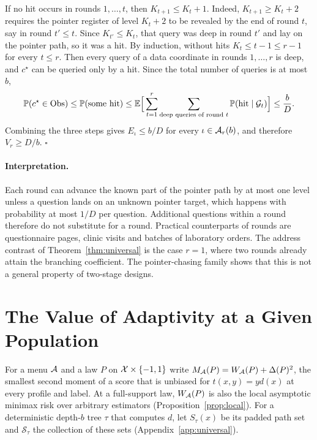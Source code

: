 If no hit occurs in rounds $1,\ldots,t$, then $K_{t+1}\le K_t+1$. Indeed,
$K_{t+1}\ge K_t+2$ requires the pointer register of level $K_t+2$ to be
revealed by the end of round $t$, say in round $t'\le t$. Since
$K_{t'}\le K_t$, that query was deep in round $t'$ and lay on the pointer path,
so it was a hit. By induction, without hits $K_t\le t-1\le r-1$ for every
$t\le r$. Then every query of a data coordinate in rounds $1,\ldots,r$ is deep,
and $c^\star$ can be queried only by a hit. Since the total number of queries
is at most $b$,
\[
 \mathbb P(c^\star\in{\rm Obs})\le\mathbb P(\text{some hit})
 \le\mathbb{E}\Big[\sum_{t=1}^r\sum_{\text{deep queries of round }t}\mathbb P(\text{hit}\mid\mathcal G_t)\Big]
 \le\frac bD .
\]
Combining the three steps gives $E_\iota\le b/D$ for every $\iota\in\mathcal A_r(b)$,
and therefore $V_r\ge D/b$. \hfill$\square$



\paragraph{Interpretation.}
Each round can advance the known part of the pointer path by at most one
level unless a question lands on an unknown pointer target, which happens
with probability at most $1/D$ per question. Additional questions within a
round therefore do not substitute for a round. Practical counterparts of
rounds are questionnaire pages, clinic visits and batches of laboratory
orders. The address contrast of Theorem~\ref{thm:universal} is the case
$r=1$, where two rounds already attain the branching coefficient. The
pointer-chasing family shows that this is not a general property of
two-stage designs.

\section{The Value of Adaptivity at a Given Population}\label{app:population}
For a menu $\mathcal A$ and a law $P$ on $\mathcal X\times\{-1,1\}$ write
$M_\mathcal A(P)=W_\mathcal A(P)+\Delta(P)^2$, the smallest second moment of a score that is
unbiased for $t(x,y)=yd(x)$ at every profile and label. At a full-support
law, $W_\mathcal A(P)$ is also the local asymptotic minimax risk over arbitrary
estimators (Proposition~\ref{prop:local}). For a deterministic depth-$b$ tree
$\tau$ that computes $d$, let $S_\tau(x)$ be its padded path set and
$\mathcal S_\tau$ the collection of these sets
(Appendix~\ref{app:universal}).

